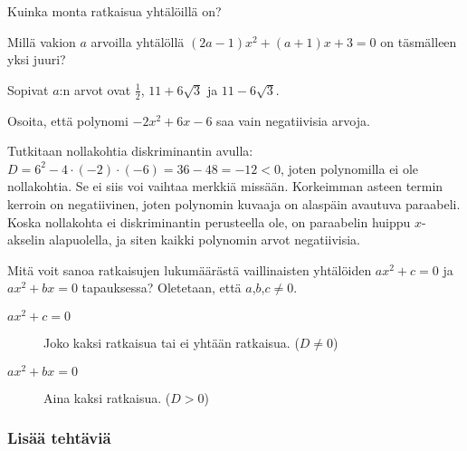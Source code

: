 \begin{tehtavasivu}
\begin{tehtava}
	Kuinka monta ratkaisua yhtälöillä on?
	\begin{vastaus}
	\end{vastaus}
\end{tehtava}

\begin{tehtava}
	Millä vakion $a$ arvoilla yhtälöllä $(2a-1)x^2+(a+1)x+3=0$ on täsmälleen yksi juuri?
	\begin{vastaus}
		Sopivat $a$:n arvot ovat $\frac{1}{2}$, $11+6\sqrt{3}$ ja $11-6\sqrt{3}$.
	\end{vastaus}
\end{tehtava}

\begin{tehtava}
Osoita, että polynomi $-2x^2+6x-6$ saa vain negatiivisia arvoja.
	\begin{vastaus}
	Tutkitaan nollakohtia diskriminantin avulla: $D=6^2-4\cdot (-2)\cdot(-6)=36-48=-12<0$, joten polynomilla ei ole nollakohtia. Se ei siis voi vaihtaa merkkiä missään. Korkeimman asteen termin kerroin on negatiivinen, joten polynomin kuvaaja on alaspäin avautuva paraabeli. Koska nollakohta ei diskriminantin perusteella ole, on paraabelin huippu $x$-akselin alapuolella, ja siten kaikki polynomin arvot negatiivisia.
	\end{vastaus}
\end{tehtava}

\begin{tehtava}
	Mitä voit sanoa ratkaisujen lukumäärästä vaillinaisten yhtälöiden $ax^2+c=0$  ja $ax^2+bx=0$  tapauksessa? Oletetaan, että $a$,$b$,$c \neq 0$.
	\begin{vastaus}
		\begin{description}
			\item[$ax^2+c=0$] Joko kaksi ratkaisua tai ei yhtään ratkaisua. ($D \neq 0$)
			\item[$ax^2+bx=0$] Aina kaksi ratkaisua. ($D > 0$)
		\end{description}
	\end{vastaus}
\end{tehtava}

\subsubsection*{Lisää tehtäviä}


\end{tehtavasivu}

